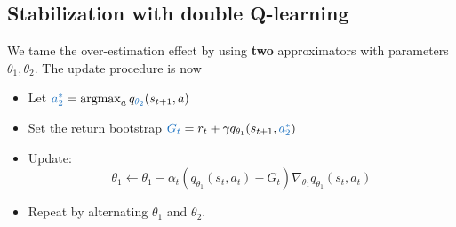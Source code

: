 \documentclass[../course-notes.tex]{subfiles}
\begin{document}
\subsection{Stabilization with double Q-learning}

We tame the over-estimation effect by using \textbf{two} approximators with parameters $\theta_1, \theta_2$. The update procedure is now
\begin{itemize}
	\item Let ${\bluefont a_2^*} = \argmax_a q_{{\bluefont \theta_2}}(s_{t+1}, a)$
	\item Set the return bootstrap
	${\bluefont G_t} = r_t + \gamma q_{\theta_1}(s_{t+1}, {\bluefont a_2^*})$
	\item Update: 
	\[
		\theta_1 \leftarrow \theta_1 - \alpha_t (q_{\theta_1}(s_t,a_t) - G_t) \nabla_{\theta_1}q_{\theta_1}(s_t, a_t)
	\]
	\item Repeat by alternating $\theta_1$ and $\theta_2$.
\end{itemize}
\end{document}

